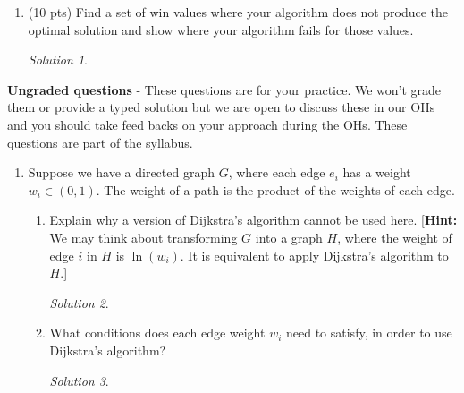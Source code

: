 \documentclass[12pt]{article}
\theoremstyle{remark}
\newtheorem*{solution}{Solution}
\begin{document}
\begin{enumerate}
\begin{enumerate}
\item (10 pts) Find a set of win values where your algorithm does not produce the optimal solution and show where your algorithm fails for those values. 
\begin{solution}

\end{solution}

    \end{enumerate}

\end{enumerate}

\pagebreak
\textbf{Ungraded questions} - These questions are for your practice. We won't grade them or provide a typed solution but we are open to discuss these in our OHs and you should take feed backs on your approach during the OHs. These questions are part of the syllabus. 

\begin{enumerate}

\item Suppose we have a directed graph $G$, where each edge $e_{i}$ has a weight $w_{i} \in (0, 1).$  The weight of a path is the product of the weights of each edge. 
\begin{enumerate}[label=(\alph*)]
\item Explain why a version of Dijkstra's algorithm cannot be used here. [\textbf{Hint:} We may think about transforming $G$ into a graph $H$, where the weight of edge $i$ in $H$ is $\ln(w_{i})$. It is equivalent to apply Dijkstra's algorithm to $H$.]
\begin{solution}

\end{solution}

\item What conditions does each edge weight $w_{i}$ need to satisfy, in order to use Dijkstra's algorithm?
\begin{solution}

\end{solution}


\end{enumerate}



\end{enumerate}
\end{document}
